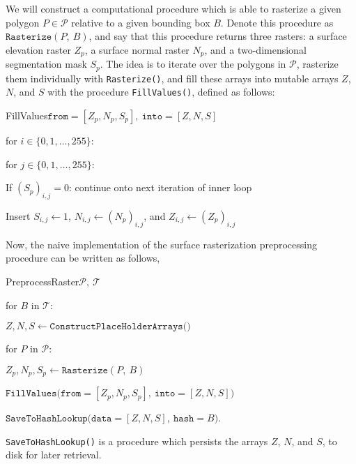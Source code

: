 We will construct a computational procedure which is able to rasterize a given polygon $P \in \mathcal{P}$ relative to a given bounding box $B$.
Denote this procedure as $\texttt{Rasterize}(P,~B)$, and say that this procedure returns three rasters: a surface elevation raster $Z_p$, a surface normal raster $N_p$, and a two-dimensional segmentation mask $S_p$.
The idea is to iterate over the polygons in $\mathcal{P}$, rasterize them individually with \texttt{Rasterize()}, and fill these arrays into mutable arrays $Z$, $N$, and $S$ with the procedure \texttt{FillValues()}, defined as follows:
%
\begin{pseudofunc}{FillValues}{$\texttt{from}=[Z_p, N_p, S_p],~\texttt{into}=[Z, N, S]$}
  \item for $i \in \{0, 1, \ldots, 255\}$:
  \begin{pseudoloop}
    \item for $j \in \{0, 1, \ldots, 255\}$:
    \begin{pseudoloop}
      \item If $(S_p)_{i,j} = 0$: continue onto next iteration of inner loop
      \item Insert $S_{i,j} \leftarrow 1$, $N_{i,j} \leftarrow (N_p)_{i,j}$, and $Z_{i,j} \leftarrow (Z_p)_{i,j}$
    \end{pseudoloop}
  \end{pseudoloop}
\end{pseudofunc}
%
Now, the naive implementation of the surface rasterization preprocessing procedure can be written as follows,
%
\begin{pseudofunc}{PreprocessRaster}{$\mathcal{P},~\mathcal{T}$}
  \item for $B$ in $\mathcal{T}$:
  \begin{pseudoloop}
    \item $Z, N, S \leftarrow \texttt{ConstructPlaceHolderArrays()}$
    \item for $P$ in $\mathcal{P}$:
    \begin{pseudoloop}
      \item $Z_p, N_p, S_p \leftarrow \texttt{Rasterize}(P,~B)$
      \item $\texttt{FillValues(from}=[Z_p, N_p, S_p],~\texttt{into}=[Z, N, S])$
    \end{pseudoloop}
    \item $\texttt{SaveToHashLookup(data}=[Z, N, S],~\texttt{hash}=B)$.
  \end{pseudoloop}
\end{pseudofunc}
%
\texttt{SaveToHashLookup()} is a procedure which persists the arrays $Z$, $N$, and $S$, to disk for later retrieval.
